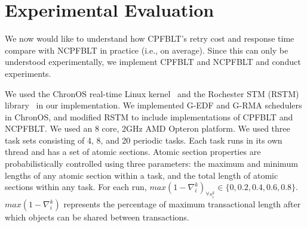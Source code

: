 \documentclass[conference]{IEEEtran}
\begin{document}
\section{Experimental Evaluation}\label{exp_eval}
%
We now would like to understand how CPFBLT's retry cost and response time compare with NCPFBLT in practice (i.e., on average). Since this can only be understood experimentally, we implement CPFBLT and NCPFBLT and conduct experiments. 

We used the ChronOS real-time Linux kernel~\cite{dellinger2011chronos} and the Rochester STM (RSTM) library~\cite{marathe2006lowering} in our implementation. We implemented G-EDF and G-RMA schedulers in ChronOS, and modified RSTM to include implementations of CPFBLT and NCPFBLT. We used an 8 core, 2GHz AMD Opteron platform. We used three task sets consisting of 4, 8, and 20 periodic tasks. Each task runs in its own thread and has a set of atomic sections. Atomic section properties are probabilistically controlled using three parameters: the maximum and minimum lengths of any atomic section within a task, and the total length of atomic sections within any task. For each run, $max(1-\nabla_i^k)_{\forall s_i^k} \in \{0,0.2,0.4,0.6,0.8\}$. $max(1-\nabla_i^k)$ represents the percentage of maximum transactional length after which objects can be shared between transactions.
\end{document}
